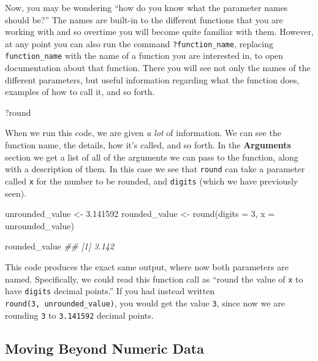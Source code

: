 \documentclass[
  letterpaper,
  DIV=11,
  numbers=noendperiod]{scrreprt}
\newenvironment{Shaded}{\begin{snugshade}}{\end{snugshade}}
\newcommand{\AttributeTok}[1]{\textcolor[rgb]{0.40,0.45,0.13}{#1}}
\newcommand{\DecValTok}[1]{\textcolor[rgb]{0.68,0.00,0.00}{#1}}
\newcommand{\DocumentationTok}[1]{\textcolor[rgb]{0.37,0.37,0.37}{\textit{#1}}}
\newcommand{\FloatTok}[1]{\textcolor[rgb]{0.68,0.00,0.00}{#1}}
\newcommand{\FunctionTok}[1]{\textcolor[rgb]{0.28,0.35,0.67}{#1}}
\newcommand{\NormalTok}[1]{\textcolor[rgb]{0.00,0.23,0.31}{#1}}
\newcommand{\OtherTok}[1]{\textcolor[rgb]{0.00,0.23,0.31}{#1}}
\theoremstyle{definition}
\theoremstyle{definition}
\theoremstyle{definition}
\theoremstyle{remark}
\begin{document}
Now, you may be wondering ``how do you know what the parameter names
should be?'' The names are built-in to the different functions that you
are working with and so overtime you will become quite familiar with
them. However, at any point you can also run the command
\texttt{?function\_name}, replacing \texttt{function\_name} with the
name of a function you are interested in, to open documentation about
that function. There you will see not only the names of the different
parameters, but useful information regarding what the function does,
examples of how to call it, and so forth.

\begin{Shaded}
\begin{Highlighting}[]
\NormalTok{?round}
\end{Highlighting}
\end{Shaded}

When we run this code, we are given \emph{a lot} of information. We can
see the function name, the details, how it's called, and so forth. In
the \textbf{Arguments} section we get a list of all of the arguments we
can pass to the function, along with a description of them. In this case
we see that \texttt{round} can take a parameter called \texttt{x} for
the number to be rounded, and \texttt{digits} (which we have previously
seen).

\begin{Shaded}
\begin{Highlighting}[]
\NormalTok{unrounded\_value }\OtherTok{\textless{}{-}} \FloatTok{3.141592}
\NormalTok{rounded\_value }\OtherTok{\textless{}{-}} \FunctionTok{round}\NormalTok{(}\AttributeTok{digits =} \DecValTok{3}\NormalTok{, }\AttributeTok{x =}\NormalTok{ unrounded\_value)}

\NormalTok{rounded\_value}
\DocumentationTok{\#\# [1] 3.142}
\end{Highlighting}
\end{Shaded}

This code produces the exact same output, where now both parameters are
named. Specifically, we could read this function call as ``round the
value of \texttt{x} to have \texttt{digits} decimal points.'' If you had
instead written \texttt{round(3,\ unrounded\_value)}, you would get the
value \texttt{3}, since now we are rounding \texttt{3} to
\texttt{3.141592} decimal points.

\subsection{Moving Beyond Numeric
Data}\label{moving-beyond-numeric-data}
\end{document}
